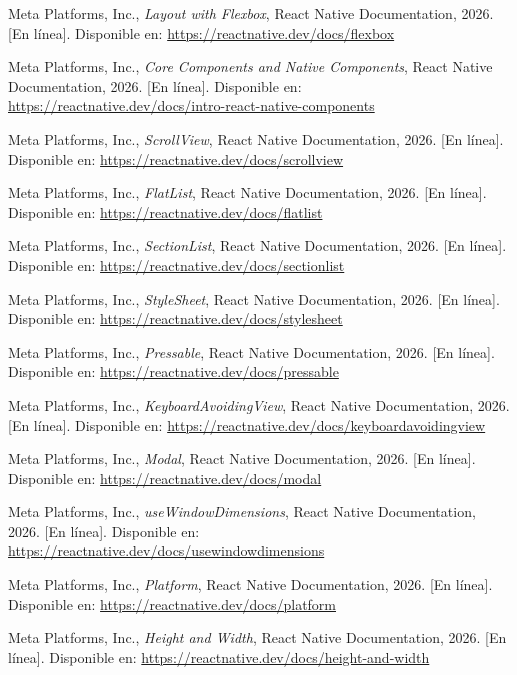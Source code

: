 \clearpage
{}

\begin{enumerate}[label={[\arabic*]}, leftmargin=*, itemsep=3pt]
    \item Meta Platforms, Inc., \textit{Layout with Flexbox}, React Native Documentation, 2026. [En línea]. Disponible en: \url{https://reactnative.dev/docs/flexbox}
    \item Meta Platforms, Inc., \textit{Core Components and Native Components}, React Native Documentation, 2026. [En línea]. Disponible en: \url{https://reactnative.dev/docs/intro-react-native-components}
    \item Meta Platforms, Inc., \textit{ScrollView}, React Native Documentation, 2026. [En línea]. Disponible en: \url{https://reactnative.dev/docs/scrollview}
    \item Meta Platforms, Inc., \textit{FlatList}, React Native Documentation, 2026. [En línea]. Disponible en: \url{https://reactnative.dev/docs/flatlist}
    \item Meta Platforms, Inc., \textit{SectionList}, React Native Documentation, 2026. [En línea]. Disponible en: \url{https://reactnative.dev/docs/sectionlist}
    \item Meta Platforms, Inc., \textit{StyleSheet}, React Native Documentation, 2026. [En línea]. Disponible en: \url{https://reactnative.dev/docs/stylesheet}
    \item Meta Platforms, Inc., \textit{Pressable}, React Native Documentation, 2026. [En línea]. Disponible en: \url{https://reactnative.dev/docs/pressable}
    \item Meta Platforms, Inc., \textit{KeyboardAvoidingView}, React Native Documentation, 2026. [En línea]. Disponible en: \url{https://reactnative.dev/docs/keyboardavoidingview}
    \item Meta Platforms, Inc., \textit{Modal}, React Native Documentation, 2026. [En línea]. Disponible en: \url{https://reactnative.dev/docs/modal}
    \item Meta Platforms, Inc., \textit{useWindowDimensions}, React Native Documentation, 2026. [En línea]. Disponible en: \url{https://reactnative.dev/docs/usewindowdimensions}
    \item Meta Platforms, Inc., \textit{Platform}, React Native Documentation, 2026. [En línea]. Disponible en: \url{https://reactnative.dev/docs/platform}
    \item Meta Platforms, Inc., \textit{Height and Width}, React Native Documentation, 2026. [En línea]. Disponible en: \url{https://reactnative.dev/docs/height-and-width}

\end{enumerate}
